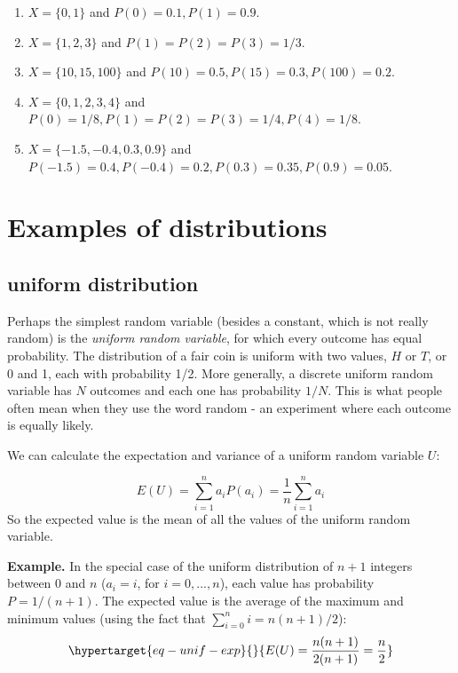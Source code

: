 \documentclass[
  letterpaper,
  DIV=11,
  numbers=noendperiod]{scrreprt}
\begin{document}
\begin{enumerate}
\def\labelenumi{\arabic{enumi}.}
\item
  \(X=\{0, 1\}\) and \(P(0) = 0.1, P(1) = 0.9\).
\item
  \(X=\{1,2,3\}\) and \(P(1) = P(2) = P(3)=1/3\).
\item
  \(X=\{10, 15, 100\}\) and \(P(10) = 0.5, P(15) = 0.3, P(100)=0.2\).
\item
  \(X=\{0, 1, 2, 3, 4\}\) and
  \(P(0) = 1/8, P(1) = P(2) = P(3) = 1/4, P(4) = 1/8\).
\item
  \(X=\{-1.5, -0.4, 0.3, 0.9\}\) and
  \(P(-1.5) = 0.4, P(-0.4) = 0.2, P(0.3) = 0.35, P(0.9) = 0.05\).
\end{enumerate}

\hypertarget{examples-of-distributions}{%
\section{Examples of distributions}\label{examples-of-distributions}}

\label{sec:math4_2}

\hypertarget{uniform-distribution}{%
\subsection{uniform distribution}\label{uniform-distribution}}

Perhaps the simplest random variable (besides a constant, which is not
really random) is the \emph{uniform random variable}, for which every
outcome has equal probability. The distribution of a fair coin is
uniform with two values, \(H\) or \(T\), or 0 and 1, each with
probability 1/2. More generally, a discrete uniform random variable has
\(N\) outcomes and each one has probability \(1/N\). This is what people
often mean when they use the word random - an experiment where each
outcome is equally likely.

We can calculate the expectation and variance of a uniform random
variable \(U\):

\[
E(U) = \sum_{i=1}^n  a_i P(a_i) = \frac{1}{n}  \sum_{i=1}^n  a_i 
\] So the expected value is the mean of all the values of the uniform
random variable.

\textbf{Example.} In the special case of the uniform distribution of
\(n+1\) integers between 0 and \(n\) (\(a_i = i\), for \(i=0,..., n\)),
each value has probability \(P = 1/(n+1)\). The expected value is the
average of the maximum and minimum values (using the fact that
\(\sum_{i=0}^n i = n(n+1)/2\)):
\begin{equation}\protect\hypertarget{eq-unif-exp}{}{ E(U) = \frac{n(n+1)}{2(n+1)} = \frac{n}{2} }\label{eq-unif-exp}\end{equation}
\end{document}

